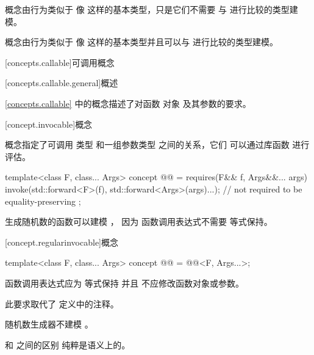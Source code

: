 \begin{itemdescr}
\pnum
\begin{note}
 概念由行为类似于
像  这样的基本类型，只是它们不需要
与 \tcode{==} 进行比较的类型建模。
\end{note}

\pnum
\begin{note}
 概念由行为类似于
像  这样的基本类型并且可以与 \tcode{==} 进行比较的类型建模。
\end{note}
\end{itemdescr}

[concepts.callable]{可调用概念}

[concepts.callable.general]{概述}

\pnum
\ref{concepts.callable} 中的概念描述了对函数
对象 及其参数的要求。

[concept.invocable]{概念 }

\pnum
{} 概念指定了可调用
类型  和一组参数类型  之间的关系，它们
可以通过库函数  进行评估。

\begin{itemdecl}
template<class F, class... Args>
  concept @@ = requires(F&& f, Args&&... args) {
    invoke(std::forward<F>(f), std::forward<Args>(args)...); // not required to be equality-preserving
  };
\end{itemdecl}

\begin{itemdescr}
\pnum
\begin{example}
生成随机数的函数可以建模 ，
因为  函数调用表达式不需要
等式保持。
\end{example}
\end{itemdescr}

[concept.regularinvocable]{概念 }

\begin{itemdecl}
template<class F, class... Args>
  concept @@ = @@<F, Args...>;
\end{itemdecl}

\begin{itemdescr}
\pnum
{} 函数调用表达式应为
等式保持 并且
不应修改函数对象或参数。
\begin{note}
此要求取代了  定义中的注释。
\end{note}

\pnum
\begin{example}
随机数生成器不建模 。
\end{example}

\pnum
\begin{note}
 和  之间的区别
纯粹是语义上的。
\end{note}
\end{itemdescr}

